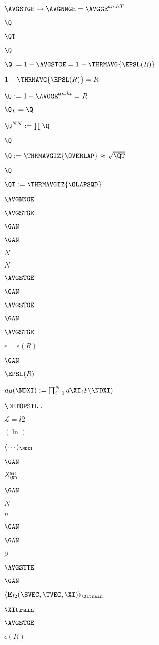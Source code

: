 $\AVGSTGE\rightarrow\AVGNNGE=\AVGGE^{an,hT}$

$\Q$

$\QT$

$\Q$

$\Q:= 1-\AVGSTGE = 1-\THRMAVG{\EPSL(R)}$

$1-\THRMAVG{\EPSL(R)}=R$

$\Q:= 1-\AVGGE^{an,ht} = R$

$\Q_{L}=\Q$

$\Q^{NN}:=\prod \Q$

$\Q$

$\Q:=\THRMAVGIZ{\OVERLAP}\approx\sqrt{\QT}$

$\Q$

$\QT:=\THRMAVGIZ{\OLAPSQD}$


$\AVGNNGE$

$\AVGSTGE$

$\GAN$

$\GAN$

$N$

$N$

$\AVGSTGE$

$\GAN$

$\AVGSTGE$

$\GAN$

$\AVGSTGE$

$\epsilon = \epsilon(R)$

$\GAN$

$\EPSL(R)$

$d\mu(\NDXI):=\prod_{i=1}^{N}d\XI_{i} P(\NDXI)$

$\DETOPSTLL$

$\mathcal{L}=l2$

$(\ln)$

$\langle\cdots\rangle_{\NDXI}$

$\GAN$

$Z^{an}_{\ND}$

$\GAN$

$N$

$n$

$\GAN$

$\GAN$

$\beta$

$\AVGSTTE$

$\GAN$

$\langle  \mathbf{E}_{l2}(\SVEC,\TVEC,\XI) \rangle_{\XItrain}$

$\XItrain$

$\AVGSTGE$

$\epsilon(R)$

